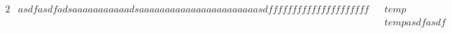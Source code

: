 \begin{alignat}{2}
	 & asdfasdfadsaaaaaaaaaaadsaaaaaaaaaaaaaaaaaaaaaaasdfffffffffffffffffffff &  & temp \\
	 &  &  & tempasdfasdf                                                               \\
\end{alignat}
